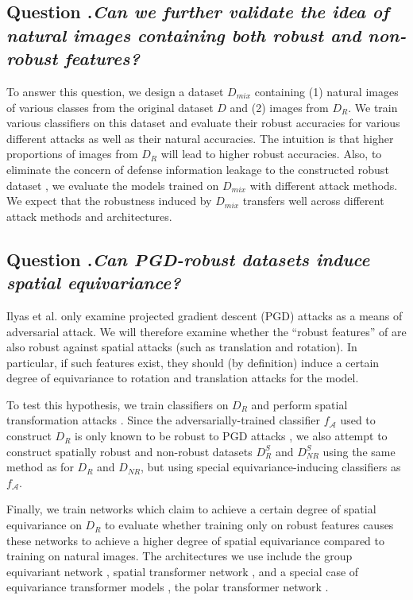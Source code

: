 \subsection*{Question .\quad \rm{\textit{Can we further validate the idea of natural images containing both robust and non-robust features?}}} \label{q2}

To answer this question, we design a dataset $D_{mix}$ containing (1) natural images of various classes from the original dataset $D$ and (2) images from $D_R$. We train various classifiers on this dataset and evaluate their robust accuracies for various different attacks as well as their natural accuracies. The intuition is that higher proportions of images from $D_R$ will lead to higher robust accuracies. Also, to eliminate the concern of defense information leakage to the constructed robust dataset \cite{engstrom2019a}, we evaluate the models trained on $D_{mix}$ with different attack methods. We expect that the robustness induced by $D_{mix}$ transfers well across different attack methods and architectures.

\subsection*{Question .\quad \rm{\textit{Can PGD-robust datasets induce spatial equivariance?}}} \label{q3}

Ilyas et al. only examine projected gradient descent (PGD) attacks \cite{Madry18} as a means of adversarial attack. We will therefore examine whether the ``robust features'' of \cite{Ilyas2019} are also robust against spatial attacks (such as translation and rotation). In particular, if such features exist, they should (by definition) induce a certain degree of equivariance to rotation and translation attacks for the model.

To test this hypothesis, we train classifiers on $D_R$ and perform spatial transformation attacks \cite{Engstrom17}. Since the adversarially-trained classifier $f_\mathcal{A}$ used to construct $D_R$ is only known to be robust to PGD attacks \cite{Madry18}, we also attempt to construct spatially robust and non-robust datasets $D_R^S$ and $D_{NR}^S$ using the same method as for $D_R$ and $D_{NR}$, but using special equivariance-inducing classifiers as $f_\mathcal{A}$. 

Finally, we train networks which claim to achieve a certain degree of spatial equivariance on $D_R$ to evaluate whether training only on robust features causes these networks to achieve a higher degree of spatial equivariance compared to training on natural images. The architectures we use include the group equivariant network \cite{Cohen16}, spatial transformer network \cite{Jaderberg15}, and a special case of equivariance transformer models \cite{Esteves18}, the polar transformer network \cite{Tai19}.

